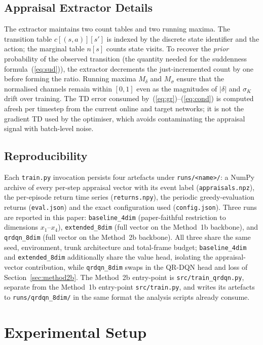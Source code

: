 \documentclass[conference]{IEEEtran}
\begin{document}
\subsection{Appraisal Extractor Details}
The extractor maintains two count tables and two running maxima. The
transition table $c[(s,a)][s']$ is indexed by the discrete state identifier
and the action; the marginal table $n[s]$ counts state visits. To recover the
\emph{prior} probability of the observed transition (the quantity needed for
the suddenness formula~(\ref{eq:sud})), the extractor decrements the
just-incremented count by one before forming the ratio. Running maxima
$M_{\delta}$ and $M_{\sigma}$ ensure that the normalised channels remain
within $[0, 1]$ even as the magnitudes of $|\delta|$ and $\sigma_{K}$ drift
over training. The TD error consumed by~(\ref{eq:gr})--(\ref{eq:cond}) is
computed afresh per timestep from the current online and target networks; it
is not the gradient TD used by the optimiser, which avoids contaminating the
appraisal signal with batch-level noise.

\subsection{Reproducibility}
Each \texttt{train.py} invocation persists four artefacts under
\texttt{runs/<name>/}: a NumPy archive of every per-step appraisal vector
with its event label (\texttt{appraisals.npz}), the per-episode return time
series (\texttt{returns.npy}), the periodic greedy-evaluation returns
(\texttt{eval.json}) and the exact configuration used (\texttt{config.json}).
Three runs are reported in this paper: \texttt{baseline\_4dim}
(paper-faithful restriction to dimensions $x_{1}$--$x_{4}$),
\texttt{extended\_8dim} (full vector on the Method~1b backbone), and
\texttt{qrdqn\_8dim} (full vector on the Method~2b backbone). All three
share the same seed, environment, trunk architecture and total-frame
budget; \texttt{baseline\_4dim} and \texttt{extended\_8dim} additionally
share the value head, isolating the appraisal-vector contribution, while
\texttt{qrdqn\_8dim} swaps in the QR-DQN head and loss of
Section~\ref{sec:method2b}. The Method~2b entry-point is
\texttt{src/train\_qrdqn.py}, separate from the Method~1b entry-point
\texttt{src/train.py}, and writes its artefacts to
\texttt{runs/qrdqn\_8dim/} in the same format the analysis scripts
already consume.

\section{Experimental Setup}
\label{sec:experiments}
\end{document}
